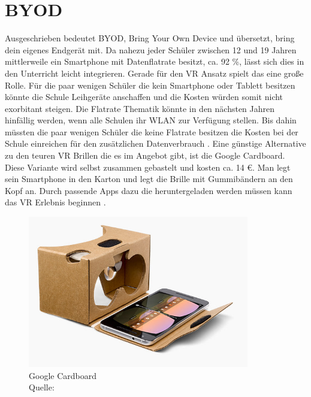 \section{BYOD}
Ausgeschrieben bedeutet BYOD, Bring Your Own Device und übersetzt, bring dein eigenes Endgerät mit. Da nahezu jeder Schüler zwischen 12 und 19 Jahren mittlerweile ein Smartphone mit Datenflatrate besitzt, ca. 92 \%, lässt sich dies in den Unterricht leicht integrieren. Gerade für den VR Ansatz spielt das eine große Rolle. Für die paar wenigen Schüler die kein Smartphone oder Tablett besitzen könnte die Schule Leihgeräte anschaffen und die Kosten würden somit nicht exorbitant steigen. Die Flatrate Thematik könnte in den nächsten Jahren hinfällig werden, wenn alle Schulen ihr WLAN zur Verfügung stellen. Bis dahin müssten die paar wenigen Schüler die keine Flatrate besitzen die Kosten bei der Schule einreichen für den zusätzlichen Datenverbrauch \cite[vgl.][]{Cardboard1}. 
Eine günstige Alternative zu den teuren VR Brillen die es im Angebot gibt, ist die Google Cardboard. Diese Variante wird selbst zusammen gebastelt und kosten ca. 14 \euro{}. Man legt sein Smartphone in den Karton und legt die Brille mit Gummibändern an den Kopf an. Durch passende Apps dazu die heruntergeladen werden müssen kann das VR Erlebnis beginnen \cite[vgl.][]{Cardboard2}.

\begin{figure}[ht]
	\centering
	\includegraphics[width=\textwidth,height=\textheight,keepaspectratio]{images/Google Carboard.png}
	\caption{Google Cardboard  \\ Quelle: \cite[vgl.][]{Cardboard2}}
	\label{Google Cardboard}
\end{figure}

